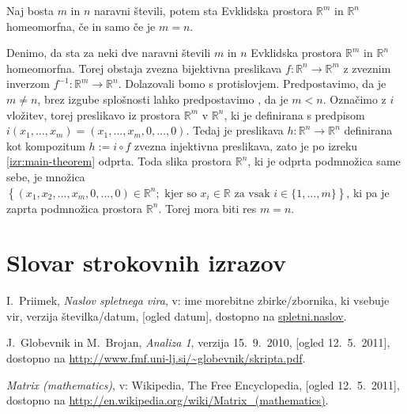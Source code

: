 \documentclass[mat1]{fmfdelo}
\newcommand{\R}{\mathbb R}
\newcommand{\0}{\underline{0}}
\begin{document}
\begin{izrek}\label{izr:dim_izr}
Naj bosta $m$ in $n$ naravni števili, potem sta Evklidska prostora $\R^m$ in $\R^n$ homeomorfna, če in samo če je $m = n$.
\end{izrek}

\begin{dokaz}
Denimo, da sta za neki dve naravni števili $m$ in $n$ Evklidska prostora $\R^m$ in $\R^n$ homeomorfna. Torej obstaja zvezna bijektivna preslikava $f : \R^n \to \R^m$ z zveznim inverzom $f^{-1} : \R^m \to \R^n$. Dolazovali bomo s protislovjem. Predpostavimo, da je $m \neq n$, brez izgube splošnosti lahko predpostavimo , da je $m < n$. Označimo z $i$ vložitev, torej preslikavo iz prostora $\R^m$ v $\R^n$, ki je definirana s predpisom $i(x_1, \dots, x_m) = (x_1, \dots, x_m, 0, \dots, 0)$. Tedaj je preslikava $h : \R^n \to \R^n$ definirana kot kompozitum $h := i \circ f$ zvezna injektivna preslikava, zato je po izreku \ref{izr:main-theorem} odprta. Toda slika prostora $\R^n$, ki je odprta podmnožica same sebe, je množica $\left \{ (x_1, x_2, \dots, x_m, 0, \dots, 0) \in \R^n ; \text{ kjer so } x_i \in \R \text{ za vsak } i \in \{1, \dots, m \}  \right \}$, ki pa je zaprta podmnožica prostora $\R^n$. Torej mora biti res $m = n$.
\end{dokaz}

\section*{Slovar strokovnih izrazov}

\geslo{}{}
\geslo{}{}

\begin{thebibliography}{99}


I.~Priimek, \emph{Naslov spletnega vira}, v: ime morebitne zbirke/zbornika, ki vsebuje vir, verzija številka/datum, [ogled datum], dostopno na \url{spletni.naslov}.

J.~Globevnik in M.~Brojan, \emph{Analiza 1}, verzija 15.~9.~2010, [ogled 12.~5.~2011], dostopno na \url{http://www.fmf.uni-lj.si/~globevnik/skripta.pdf}.

\emph{Matrix (mathematics)}, v: Wikipedia, The Free Encyclopedia, [ogled 12.~5.~2011], dostopno na \url{http://en.wikipedia.org/wiki/Matrix_(mathematics)}.

\end{thebibliography}
\end{document}
